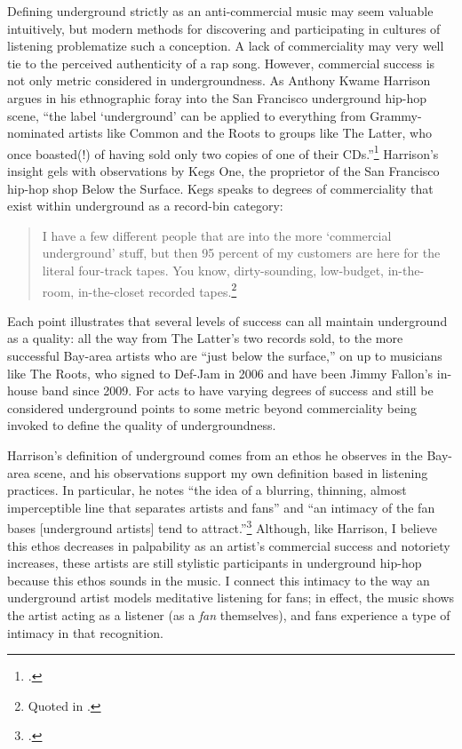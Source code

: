 Defining underground strictly as an anti-commercial music may seem valuable intuitively, but 
modern methods for discovering and participating in cultures of listening problematize such a
conception. A lack of commerciality may very well tie to the perceived authenticity of a rap
song. However, commercial success is not only metric considered in undergroundness. As Anthony
Kwame Harrison argues in his ethnographic foray into the San Francisco underground hip-hop scene, 
``the label `underground' can be applied to everything from Grammy-nominated artists like Common 
and the Roots to groups like The Latter, who once boasted(!) of having sold only two copies of one
of their CDs.''\footnote{
    \autocite[9]{anthonykwameharrisonHipHopUnderground2009}.}
Harrison's insight gels with observations by Kegs One, the proprietor of the San  Francisco 
hip-hop shop Below the Surface. Kegs speaks to degrees of commerciality that exist within 
underground as a record-bin category:
    \begin{quote}
        \small I have a few different people that are into the more `commercial underground' stuff, 
        but then 95 percent of my customers are here for the  literal four-track tapes. You 
        know,  dirty-sounding, low-budget, in-the-room, in-the-closet recorded 
        tapes.\footnote{
            Quoted in \autocite[10]{anthonykwameharrisonHipHopUnderground2009}.}
    \end{quote}
Each point illustrates that several levels of success can all maintain underground as a quality:
all the way from The Latter's two records sold, to the more successful Bay-area artists who are
``just below the surface,'' on up to  musicians like The Roots, who signed to Def-Jam in 2006 
and  have been Jimmy Fallon's in-house band since 2009. For acts to have varying degrees of success 
and still be considered underground points to some metric beyond commerciality being invoked to 
define the quality of undergroundness.

Harrison's definition of underground comes from an ethos he observes in the Bay-area scene, and his 
observations support my own definition based in listening practices. In particular, he notes
``the idea of a blurring, thinning, almost imperceptible line that separates artists and fans'' and
``an intimacy of the fan bases [underground artists] tend to attract.''\footnote{
    \autocite[10--11]{anthonykwameharrisonHipHopUnderground2009}.}
Although, like Harrison, I believe this ethos decreases in palpability as an artist's commercial 
success and notoriety increases, these artists are still stylistic participants in underground 
hip-hop because this ethos sounds in the music. I connect this intimacy to the way an underground
artist models meditative listening for fans; in effect, the music shows the artist acting as a 
listener (as a \emph{fan} themselves), and fans experience a type of intimacy in that recognition.

